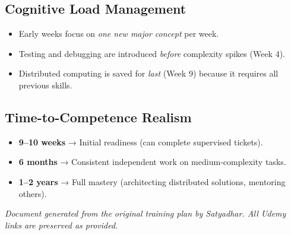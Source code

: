 \documentclass[12pt]{article}
\begin{document}
	\subsection*{Cognitive Load Management}
	\begin{itemize}
		\item Early weeks focus on \emph{one new major concept} per week.
		\item Testing and debugging are introduced \emph{before} complexity spikes (Week 4).
		\item Distributed computing is saved for \emph{last} (Week 9) because it requires all previous skills.
	\end{itemize}
	
	\subsection*{Time-to-Competence Realism}
	\begin{itemize}
		\item \textbf{9–10 weeks} → Initial readiness (can complete supervised tickets).
		\item \textbf{6 months} → Consistent independent work on medium‑complexity tasks.
		\item \textbf{1–2 years} → Full mastery (architecting distributed solutions, mentoring others).
	\end{itemize}
	
	\vspace{1cm}
	\noindent\textit{Document generated from the original training plan by Satyadhar. All Udemy links are preserved as provided.}
	
\end{document}
